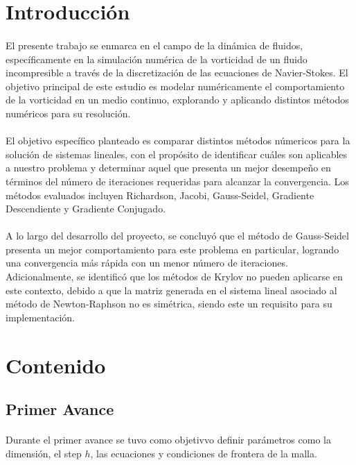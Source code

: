 \documentclass{article}
\begin{document}
  \section*{Introducción}
  \paragraph{}
  El presente trabajo se enmarca en el campo de la dinámica de fluidos, específicamente en la simulación numérica de la vorticidad de un fluido incompresible a través de la discretización de las ecuaciones de Navier-Stokes. El objetivo principal de este estudio es modelar numéricamente el comportamiento de la vorticidad en un medio continuo, explorando y aplicando distintos métodos numéricos para su resolución.

  \paragraph{}
  El objetivo específico planteado es comparar distintos métodos númericos para la solución de sistemas lineales, con el propósito de identificar cuáles son aplicables a nuestro problema y determinar aquel que presenta un mejor desempeño en términos del número de iteraciones requeridas para alcanzar la convergencia. Los métodos evaluados incluyen Richardson, Jacobi, Gauss-Seidel, Gradiente Descendiente y Gradiente Conjugado.
  
  \paragraph{}
  A lo largo del desarrollo del proyecto, se concluyó que el método de Gauss-Seidel presenta un mejor comportamiento para este problema en particular, logrando una convergencia más rápida con un menor número de iteraciones. Adicionalmente, se identificó que los métodos de Krylov no pueden aplicarse en este contexto, debido a que la matriz generada en el sistema lineal asociado al método de Newton-Raphson no es simétrica, siendo este un requisito para su implementación.
  
  \section*{Contenido}

  \subsection*{Primer Avance}
  \paragraph{}
  Durante el primer avance se tuvo como objetivvo definir parámetros como la dimensión, el step $h$, las ecuaciones y condiciones de frontera de la malla.
\end{document}
